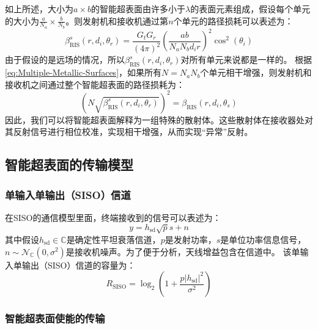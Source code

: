 \documentclass[supercite]{HustGraduPaper}
\begin{document}
如上所述，大小为$a \times b$的智能超表面由许多小于$\lambda$的表面元素组成，假设每个单元的大小为$\frac{a}{N_a} \times \frac{b}{N_b}$。则发射机和接收机通过第$n$个单元的路径损耗可以表述为：
\begin{equation}
	\beta_{\mathrm{RIS}}^{s}\left(r, d_{i}, \theta_{r}\right)=\frac{G_{t} G_{r}}{(4 \pi)^{2}}\left(\frac{a b}{N_{a} N_{b} d_{i} r}\right)^{2} \cos ^{2}\left(\theta_{i}\right)
\end{equation}
由于假设的是远场的情况，所以$\beta_{\mathrm{RIS}}^{s}\left(r, d_{i}, \theta_{r}\right)$对所有单元来说都是一样的。
根据\autoref{eq:Multiple-Metallic-Surfaces}，如果所有$N=N_a N_b$个单元相干增强，则发射机和接收机之间通过整个智能超表面的路径损耗为：
\begin{equation}
	\left(N \sqrt{\beta_{\mathrm{RIS}}^{s}\left(r, d_{i}, \theta_{r}\right)}\right)^{2}=\beta_{\mathrm{RIS}}\left(r, d_{i}, \theta_{s}\right)
\end{equation}
因此，我们可以将智能超表面解释为一组特殊的散射体。这些散射体在接收器处对其反射信号进行相位校准，实现相干增强，从而实现“异常”反射。

\subsection{智能超表面的传输模型}\label{subsec:transmission}

\subsubsection{单输入单输出（SISO）信道}

在SISO的通信模型里面，终端接收到的信号可以表述为：
\begin{equation}
	y=h_{\mathrm{sd}} \sqrt{p} s + n
\end{equation}
其中假设$h_{\mathrm{sd}} \in \mathbb{C}$是确定性平坦衰落信道，$p$是发射功率，$s$是单位功率信息信号，$n \sim \mathcal{N}_{\mathbb{C}}\left(0, \sigma^{2}\right)$是接收机噪声。为了便于分析，天线增益包含在信道中。
该单输入单输出（SISO）信道的容量为：
\begin{equation}
	R_{\mathrm{SISO}}=\log _{2}\left(1+\frac{p\left|h_{\mathrm{sd}}\right|^{2}}{\sigma^{2}}\right)
\end{equation}

\subsubsection{智能超表面使能的传输}
\end{document}
